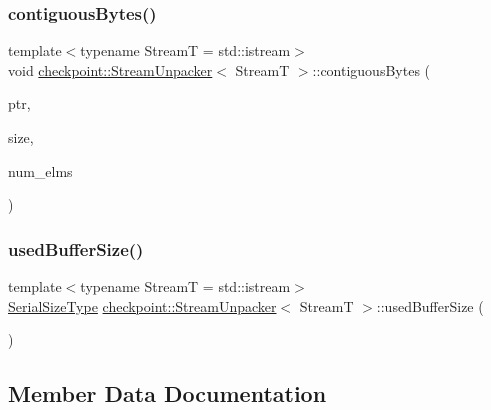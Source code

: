 \subsubsection{\texorpdfstring{contiguous\+Bytes()}{contiguousBytes()}}
{\footnotesize\ttfamily template$<$typename StreamT  = std\+::istream$>$ \\
void \hyperlink{structcheckpoint_1_1_stream_unpacker}{checkpoint\+::\+Stream\+Unpacker}$<$ StreamT $>$\+::contiguous\+Bytes (\begin{DoxyParamCaption}\item[{void $\ast$}]{ptr,  }\item[{\hyperlink{namespacecheckpoint_a083f6674da3f94c2901b18c6d238217c}{Serial\+Size\+Type}}]{size,  }\item[{\hyperlink{namespacecheckpoint_a083f6674da3f94c2901b18c6d238217c}{Serial\+Size\+Type}}]{num\+\_\+elms }\end{DoxyParamCaption})\hspace{0.3cm}{\ttfamily [inline]}}

\mbox{\label{structcheckpoint_1_1_stream_unpacker_a59f931c63b7a48812f45e658d789710d}} 
\subsubsection{\texorpdfstring{used\+Buffer\+Size()}{usedBufferSize()}}
{\footnotesize\ttfamily template$<$typename StreamT  = std\+::istream$>$ \\
\hyperlink{namespacecheckpoint_a083f6674da3f94c2901b18c6d238217c}{Serial\+Size\+Type} \hyperlink{structcheckpoint_1_1_stream_unpacker}{checkpoint\+::\+Stream\+Unpacker}$<$ StreamT $>$\+::used\+Buffer\+Size (\begin{DoxyParamCaption}{ }\end{DoxyParamCaption})\hspace{0.3cm}{\ttfamily [inline]}}



\subsection{Member Data Documentation}
\mbox{\label{structcheckpoint_1_1_stream_unpacker_a5cdef5ef87e200f57d316cf5f099bd87}} 
